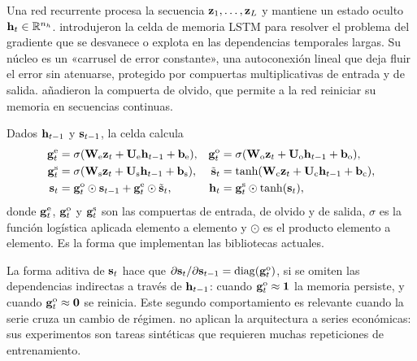 Una red recurrente procesa la secuencia $\mathbf{z}_1,\dots,\mathbf{z}_L$ y mantiene un estado oculto
$\mathbf{h}_t\in\mathbb{R}^{n_h}$. \textcite{hochreiter_schmidhuber_1997} introdujeron la celda
de memoria LSTM para resolver el problema del gradiente que se desvanece o explota en las
dependencias temporales largas. Su núcleo es un «carrusel de error constante», una autoconexión
lineal que deja fluir el error sin atenuarse, protegido por compuertas multiplicativas de entrada y
de salida. \textcite{gers_schmidhuber_cummins_2000} añadieron la compuerta de olvido, que permite a la red reiniciar su memoria en secuencias
continuas.

\begin{definicion}\label{def:lstm}
Dados $\mathbf{h}_{t-1}$ y $\mathbf{s}_{t-1}$, la celda calcula
\begin{equation}\label{eq:lstm}
\begin{aligned}
  \mathbf{g}^{\mathrm{e}}_t&=\sigma(\mathbf{W}_{\mathrm e}\mathbf{z}_t+\mathbf{U}_{\mathrm e}\mathbf{h}_{t-1}+\mathbf{b}_{\mathrm e}), &
  \mathbf{g}^{\mathrm{o}}_t&=\sigma(\mathbf{W}_{\mathrm o}\mathbf{z}_t+\mathbf{U}_{\mathrm o}\mathbf{h}_{t-1}+\mathbf{b}_{\mathrm o}),\\
  \mathbf{g}^{\mathrm{s}}_t&=\sigma(\mathbf{W}_{\mathrm s}\mathbf{z}_t+\mathbf{U}_{\mathrm s}\mathbf{h}_{t-1}+\mathbf{b}_{\mathrm s}), &
  \tilde{\mathbf{s}}_t&=\tanh(\mathbf{W}_{\mathrm c}\mathbf{z}_t+\mathbf{U}_{\mathrm c}\mathbf{h}_{t-1}+\mathbf{b}_{\mathrm c}),\\
  \mathbf{s}_t&=\mathbf{g}^{\mathrm{o}}_t\odot\mathbf{s}_{t-1}+\mathbf{g}^{\mathrm{e}}_t\odot\tilde{\mathbf{s}}_t, &
  \mathbf{h}_t&=\mathbf{g}^{\mathrm{s}}_t\odot\tanh(\mathbf{s}_t),
\end{aligned}
\end{equation}
donde $\mathbf{g}^{\mathrm{e}}_t$, $\mathbf{g}^{\mathrm{o}}_t$ y $\mathbf{g}^{\mathrm{s}}_t$ son las compuertas de entrada, de olvido y de salida, $\sigma$
es la función logística aplicada elemento a elemento y $\odot$ es el producto elemento a elemento.
Es la forma que implementan las bibliotecas actuales.
\end{definicion}

La forma aditiva de $\mathbf{s}_t$ hace que $\partial\mathbf{s}_t/\partial\mathbf{s}_{t-1}=\operatorname{diag}(\mathbf{g}^{\mathrm{o}}_t)$, si se
omiten las dependencias indirectas a través de $\mathbf{h}_{t-1}$: cuando $\mathbf{g}^{\mathrm{o}}_t\approx\mathbf{1}$ la memoria
persiste, y cuando $\mathbf{g}^{\mathrm{o}}_t\approx\mathbf{0}$ se reinicia. Este segundo comportamiento es relevante
cuando la serie cruza un cambio de régimen. \textcite{hochreiter_schmidhuber_1997} no aplican la
arquitectura a series económicas: sus experimentos son tareas sintéticas que requieren muchas
repeticiones de entrenamiento.

